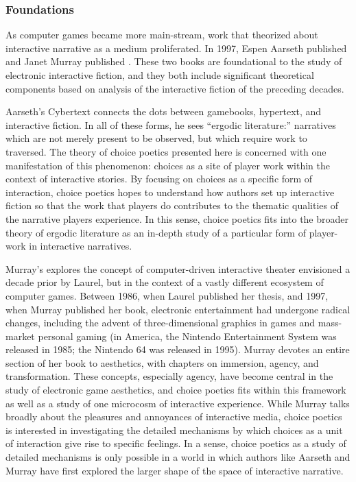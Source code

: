 \subsubsection{Foundations}

As computer games became more main-stream, work that theorized about interactive narrative as a medium proliferated. 
%
In 1997, Espen Aarseth published  and Janet Murray published  \citep{Aarseth1997,Murray1997}.
%
These two books are foundational to the study of electronic interactive fiction, and they both include significant theoretical components based on analysis of the interactive fiction of the preceding decades.


Aarseth's Cybertext connects the dots between gamebooks, hypertext, and interactive fiction.
%
In all of these forms, he sees ``ergodic literature:'' narratives which are not merely present to be observed, but which require work to traversed.
%
The theory of choice poetics presented here is concerned with one manifestation of this phenomenon: choices as a site of player work within the context of interactive stories.
%
By focusing on choices as a specific form of interaction, choice poetics hopes to understand how authors set up interactive fiction so that the work that players do contributes to the thematic qualities of the narrative players experience.
%
In this sense, choice poetics fits into the broader theory of ergodic literature as an in-depth study of a particular form of player-work in interactive narratives.


Murray's  explores the concept of computer-driven interactive theater envisioned a decade prior by Laurel, but in the context of a vastly different ecosystem of computer games.
%
Between 1986, when Laurel published her thesis, and 1997, when Murray published her book, electronic entertainment had undergone radical changes, including the advent of three-dimensional graphics in games and mass-market personal gaming (in America, the Nintendo Entertainment System was released in 1985; the Nintendo 64 was released in 1995).
%
Murray devotes an entire section of her book to aesthetics, with chapters on immersion, agency, and transformation.
%
These concepts, especially agency, have become central in the study of electronic game aesthetics, and choice poetics fits within this framework as well as a study of one microcosm of interactive experience.
%
While Murray talks broadly about the pleasures and annoyances of interactive media, choice poetics is interested in investigating the detailed mechanisms by which choices as a unit of interaction give rise to specific feelings.
%
In a sense, choice poetics as a study of detailed mechanisms is only possible in a world in which authors like Aarseth and Murray have first explored the larger shape of the space of interactive narrative.


